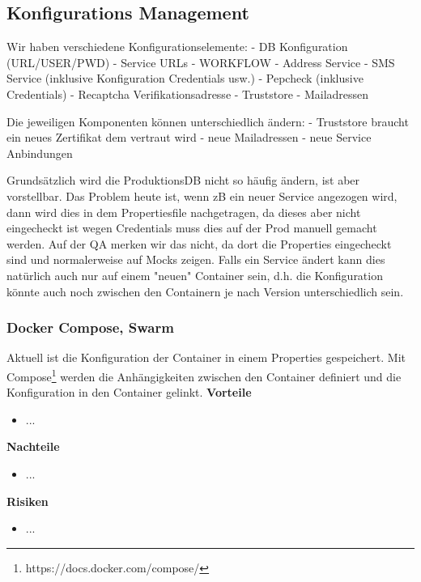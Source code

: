 \subsection{Konfigurations Management}

Wir haben verschiedene Konfigurationselemente:
- DB Konfiguration (URL/USER/PWD)
- Service URLs
	- WORKFLOW
	- Address Service
	- SMS Service (inklusive Konfiguration Credentials usw.)
	- Pepcheck (inklusive Credentials)
	- Recaptcha Verifikationsadresse
- Truststore
- Mailadressen

Die jeweiligen Komponenten können unterschiedlich ändern:
- Truststore braucht ein neues Zertifikat dem vertraut wird
- neue Mailadressen
- neue Service Anbindungen

Grundsätzlich wird die ProduktionsDB nicht so häufig ändern, ist aber vorstellbar. Das Problem heute ist, wenn zB ein neuer Service angezogen wird, dann wird dies in dem Propertiesfile nachgetragen, da dieses aber nicht eingecheckt ist wegen Credentials muss dies auf der Prod manuell gemacht werden. Auf der QA merken wir das nicht, da dort die Properties eingecheckt sind und normalerweise auf Mocks zeigen. Falls ein Service ändert kann dies natürlich auch nur auf einem "neuen" Container sein, d.h. die Konfiguration könnte auch noch zwischen den Containern je nach Version unterschiedlich sein.

\subsubsection{Docker Compose, Swarm}

Aktuell ist die Konfiguration der Container in einem Properties gespeichert. Mit Compose\footnote{https://docs.docker.com/compose/} werden die Anhängigkeiten zwischen den Container definiert und die Konfiguration in den Container gelinkt.\newline
\newline
\textbf{Vorteile}
\begin{itemize}
	\item ...
\end{itemize}
\textbf{Nachteile}
\begin{itemize}
	\item ...
\end{itemize}
\textbf{Risiken}
\begin{itemize}
	\item ...
\end{itemize}

